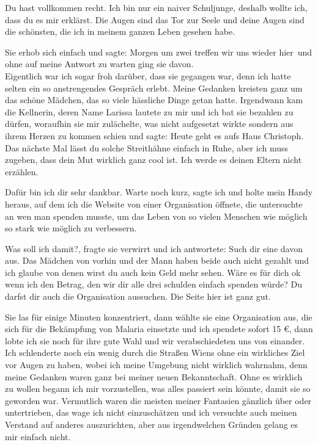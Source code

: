 \documentclass[11pt, a5paper]{article}
\newcommand{\E}{Christoph}
\begin{document}
\begin{spacing}{1.2}
		\frqq Du hast vollkommen recht. Ich bin nur ein naiver Schuljunge, deshalb wollte ich, dass du es mir erklärst. Die Augen sind das Tor zur Seele und deine Augen sind die schönsten, die ich in meinem ganzen Leben gesehen habe.\flqq
		
		Sie erhob sich einfach und sagte: \frqq Morgen um zwei treffen wir uns wieder hier\flqq\ und ohne auf meine Antwort zu warten ging sie davon.\\
		
		Eigentlich war ich sogar froh darüber, dass sie gegangen war, denn ich hatte selten ein so anstrengendes Gespräch erlebt. Meine Gedanken kreisten ganz um das schöne Mädchen, das so viele hässliche Dinge getan hatte. Irgendwann kam die Kellnerin, deren Name Larissa lautete zu mir und ich bat sie bezahlen zu dürfen, woraufhin sie mir zulächelte, was nicht aufgesetzt wirkte sondern aus ihrem Herzen zu kommen schien und sagte: \frqq Heute geht es aufs Haus \E . Das nächste Mal lässt du solche Streithähne einfach in Ruhe, aber ich muss zugeben, dass dein Mut wirklich ganz cool ist. Ich werde es deinen Eltern nicht erzählen.\flqq
		
		\frqq Dafür bin ich dir sehr dankbar. Warte noch kurz\flqq , sagte ich und holte mein Handy heraus, auf dem ich die Website von einer Organisation öffnete, die untersuchte an wen man spenden musste, um das Leben von so vielen Menschen wie möglich so stark wie möglich zu verbessern.
		
		\frqq Was soll ich damit?\flqq , fragte sie verwirrt und ich antwortete: \frqq Such dir eine davon aus. Das Mädchen von vorhin und der Mann haben beide auch nicht gezahlt und ich glaube von denen wirst du auch kein Geld mehr sehen. Wäre es für dich ok wenn ich den Betrag, den wir dir alle drei schulden einfach spenden würde? Du darfst dir auch die Organisation aussuchen. Die Seite hier ist ganz gut.\flqq
		
		Sie las für einige Minuten konzentriert, dann wählte sie eine Organisation aus, die sich für die Bekämpfung von Malaria einsetzte und ich spendete sofort 15 €, dann lobte ich sie noch für ihre gute Wahl und wir verabschiedeten uns von einander.\\
		
		Ich schlenderte noch ein wenig durch die Straßen Wiens ohne ein wirkliches Ziel vor Augen zu haben, wobei ich meine Umgebung nicht wirklich wahrnahm, denn meine Gedanken waren ganz bei meiner neuen Bekanntschaft. Ohne es wirklich zu wollen begann ich mir vorzustellen, was alles passiert sein könnte, damit sie so geworden war. Vermutlich waren die meisten meiner Fantasien gänzlich über oder untertrieben, das wage ich nicht einzuschätzen und ich versuchte auch meinen Verstand auf anderes auszurichten, aber aus irgendwelchen Gründen gelang es mir einfach nicht.
		

\end{spacing}
\end{document}
